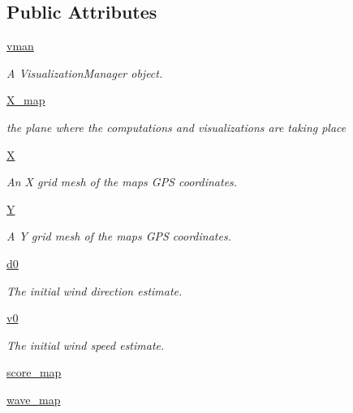 \subsection*{Public Attributes}
\begin{DoxyCompactItemize}
\item 
\mbox{\hyperlink{classpath_plan_1_1_path_planner_a8e31f83f0d8983286bb3746da568af81}{vman}}
\begin{DoxyCompactList}\small\item\em A Visualization\+Manager object. \end{DoxyCompactList}\item 
\mbox{\hyperlink{classpath_plan_1_1_path_planner_a726f4b4f55f7fb557eabceb962e25871}{X\+\_\+map}}
\begin{DoxyCompactList}\small\item\em the plane where the computations and visualizations are taking place \end{DoxyCompactList}\item 
\mbox{\hyperlink{classpath_plan_1_1_path_planner_ac7e6ed6310bc8e1064e42af17b8a5948}{X}}
\begin{DoxyCompactList}\small\item\em An X grid mesh of the map\textquotesingle{}s \textquotesingle{}G\+PS\textquotesingle{} coordinates. \end{DoxyCompactList}\item 
\mbox{\hyperlink{classpath_plan_1_1_path_planner_a4e78ffd0fb9df91a15d01ca5cb615d24}{Y}}
\begin{DoxyCompactList}\small\item\em A Y grid mesh of the map\textquotesingle{}s \textquotesingle{}G\+PS\textquotesingle{} coordinates. \end{DoxyCompactList}\item 
\mbox{\hyperlink{classpath_plan_1_1_path_planner_a508cce57c5e6deb7880fe2ef631c983e}{d0}}
\begin{DoxyCompactList}\small\item\em The initial wind direction estimate. \end{DoxyCompactList}\item 
\mbox{\hyperlink{classpath_plan_1_1_path_planner_a56e0e1649ae12d5c72409041c2aaeae9}{v0}}
\begin{DoxyCompactList}\small\item\em The initial wind speed estimate. \end{DoxyCompactList}\item 
\mbox{\hyperlink{classpath_plan_1_1_path_planner_aec7491cbbb5ea16f5fbeceecbb405efd}{score\+\_\+map}}
\item 
\mbox{\hyperlink{classpath_plan_1_1_path_planner_a3db343c9859cd328507cee118e1df6b3}{wave\+\_\+map}}
\end{DoxyCompactItemize}


